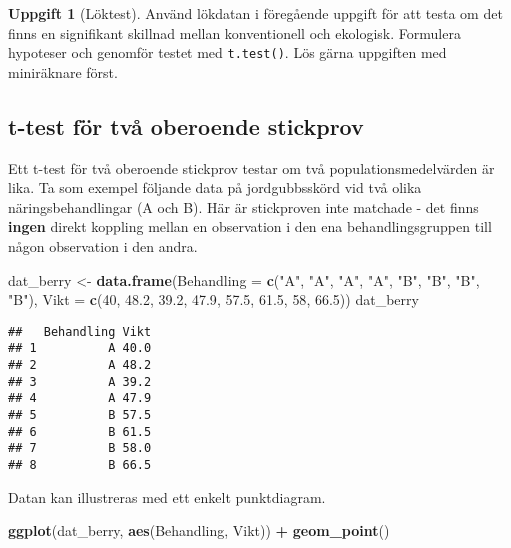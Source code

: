 \documentclass[
]{book}
\newenvironment{Shaded}{\begin{snugshade}}{\end{snugshade}}
\newcommand{\AttributeTok}[1]{\textcolor[rgb]{0.13,0.29,0.53}{#1}}
\newcommand{\DecValTok}[1]{\textcolor[rgb]{0.00,0.00,0.81}{#1}}
\newcommand{\FloatTok}[1]{\textcolor[rgb]{0.00,0.00,0.81}{#1}}
\newcommand{\FunctionTok}[1]{\textcolor[rgb]{0.13,0.29,0.53}{\textbf{#1}}}
\newcommand{\NormalTok}[1]{#1}
\newcommand{\OtherTok}[1]{\textcolor[rgb]{0.56,0.35,0.01}{#1}}
\newcommand{\SpecialCharTok}[1]{\textcolor[rgb]{0.81,0.36,0.00}{\textbf{#1}}}
\newcommand{\StringTok}[1]{\textcolor[rgb]{0.31,0.60,0.02}{#1}}
\theoremstyle{definition}
\theoremstyle{definition}
\theoremstyle{definition}
\newtheorem{exercise}{Uppgift}[chapter]
\theoremstyle{definition}
\theoremstyle{remark}
\begin{document}
\begin{exercise}[Löktest]
Använd lökdatan i föregående uppgift för att testa om det finns en signifikant skillnad mellan konventionell och ekologisk.
Formulera hypoteser och genomför testet med \texttt{t.test()}. Lös gärna uppgiften med miniräknare först.
\end{exercise}

\hypertarget{t-test-fuxf6r-tvuxe5-oberoende-stickprov}{%
\subsection{t-test för två oberoende stickprov}\label{t-test-fuxf6r-tvuxe5-oberoende-stickprov}}

Ett t-test för två oberoende stickprov testar om två populationsmedelvärden är lika. Ta som exempel följande data på jordgubbsskörd vid två olika näringsbehandlingar (A och B). Här är stickproven inte matchade - det finns \textbf{ingen} direkt koppling mellan en observation i den ena behandlingsgruppen till någon observation i den andra.

\begin{Shaded}
\begin{Highlighting}[]
\NormalTok{dat\_berry }\OtherTok{\textless{}{-}} \FunctionTok{data.frame}\NormalTok{(}\AttributeTok{Behandling =} \FunctionTok{c}\NormalTok{(}\StringTok{"A"}\NormalTok{, }\StringTok{"A"}\NormalTok{, }\StringTok{"A"}\NormalTok{, }\StringTok{"A"}\NormalTok{, }\StringTok{"B"}\NormalTok{, }\StringTok{"B"}\NormalTok{, }\StringTok{"B"}\NormalTok{, }\StringTok{"B"}\NormalTok{),}
              \AttributeTok{Vikt =} \FunctionTok{c}\NormalTok{(}\DecValTok{40}\NormalTok{, }\FloatTok{48.2}\NormalTok{, }\FloatTok{39.2}\NormalTok{, }\FloatTok{47.9}\NormalTok{, }\FloatTok{57.5}\NormalTok{, }\FloatTok{61.5}\NormalTok{, }\DecValTok{58}\NormalTok{, }\FloatTok{66.5}\NormalTok{))}
\NormalTok{dat\_berry}
\end{Highlighting}
\end{Shaded}

\begin{verbatim}
##   Behandling Vikt
## 1          A 40.0
## 2          A 48.2
## 3          A 39.2
## 4          A 47.9
## 5          B 57.5
## 6          B 61.5
## 7          B 58.0
## 8          B 66.5
\end{verbatim}

Datan kan illustreras med ett enkelt punktdiagram.

\begin{Shaded}
\begin{Highlighting}[]
\FunctionTok{ggplot}\NormalTok{(dat\_berry, }\FunctionTok{aes}\NormalTok{(Behandling, Vikt)) }\SpecialCharTok{+}
  \FunctionTok{geom\_point}\NormalTok{()}
\end{Highlighting}
\end{Shaded}
\end{document}
